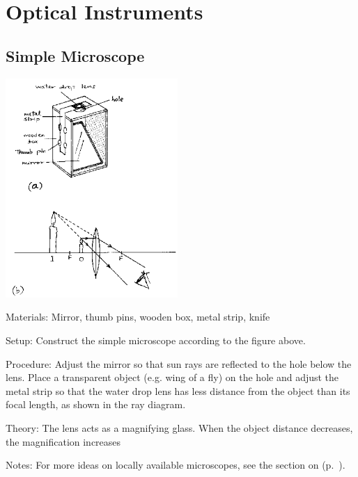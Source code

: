 \section{Optical Instruments}

\begin{multicols}{2}


\subsection{Simple Microscope}

\begin{center}
\includegraphics[width=0.49\textwidth]{./img/source/simple-microscope.png}
\end{center}

\begin{description*}
\item[Materials:]{Mirror, thumb pins, wooden box, metal strip, knife}
\item[Setup:]{Construct the simple microscope according to the figure above.}
\item[Procedure:]{Adjust the mirror so that sun rays are reflected to the hole below the lens. Place a transparent object (e.g. wing of a fly) on the hole and adjust the metal strip so that the water drop lens has less distance from the object than its focal length, as shown in the ray diagram.}
\item[Theory:]{The lens acts as a magnifying glass. When the object distance decreases, the magnification increases}
\item[Notes:]{For more ideas on locally available microscopes, see the section on  (p.~\pageref{cha:microscopy}).}
\end{description*}


\end{multicols}
